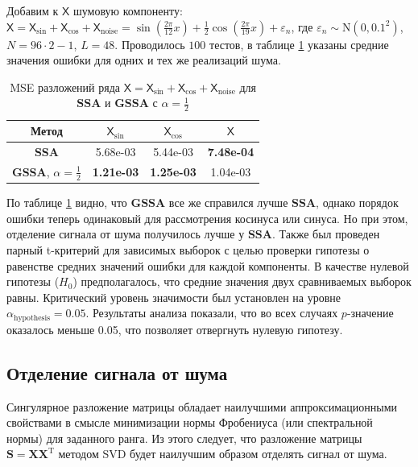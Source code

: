 \documentclass[a4paper, 11pt]{article}
\newcommand{\SSA}{\textbf{SSA}}
\newcommand{\GSSA}{\textbf{GSSA}}
\newcommand{\TS}{\mathsf{X}}
\begin{document}
Добавим к $\TS$ шумовую компоненту: $\TS = \TS_{\sin} + \TS_{\cos} + \TS_{\mathrm{noise}} =
 \sin\left(\frac{2\pi}{12}x\right) +
  \frac{1}{2}\cos\left(\frac{2\pi}{19}x\right)+
   \varepsilon_n$, 
   где $\varepsilon_n \sim \mathrm N(0, 0.1^2)$, $N = 96 \cdot 2 - 1$, $L = 48$. 
   Проводилось $100$ тестов, в таблице \ref{tab:errs_ssa_gssa} указаны средние значения ошибки для одних и тех же реализаций шума.


\begin{table}[H]
	\caption{MSE разложений ряда $\TS = \TS_{\sin} + \TS_{\cos} + \TS_{\mathrm{noise}}$ для $\SSA$ и $\GSSA$ с $\alpha = \frac{1}{2}$}
	\label{tab:errs_ssa_gssa}
	\centering
	\begin{tabular}{c|ccc}
		\hline
		Метод & $\TS_{\sin}$ & $\TS_{\cos}$ & $\TS$ \\ 
		\hline
		\textbf{SSA}      & 5.68e-03 & 5.44e-03 & \textbf{7.48e-04}  \\ 
		\textbf{GSSA}, $\alpha = \frac{1}{2}$ & \textbf{1.21e-03} & \textbf{1.25e-03} & 1.04e-03 \\
		\hline
	\end{tabular}
	
\end{table}

По таблице \ref{tab:errs_ssa_gssa} видно, что $\GSSA$ все же справился лучше $\SSA$, однако порядок ошибки теперь одинаковый для рассмотрения косинуса или синуса. Но при этом, отделение сигнала от шума получилось лучше у $\SSA$.
Также был проведен парный t-критерий для зависимых выборок с целью проверки гипотезы о равенстве средних значений ошибки для каждой компоненты. В качестве нулевой гипотезы ($H_0$) предполагалось, что средние значения двух сравниваемых выборок равны. Критический уровень значимости был установлен на уровне $\alpha_{\mathrm{hypothesis}} = 0.05$.
Результаты анализа показали, что во всех случаях $p$-значение оказалось меньше 0.05, что позволяет отвергнуть нулевую гипотезу.

\subsection{Отделение сигнала от шума}


Сингулярное разложение матрицы обладает наилучшими аппроксимационными свойствами в смысле минимизации нормы Фробениуса (или спектральной нормы) для заданного ранга. Из этого следует, что разложение матрицы $\mathbf{S} = \mathbf{X}\mathbf{X}^{\mathrm{T}}$ методом SVD будет наилучшим образом отделять сигнал от шума.
\end{document}
